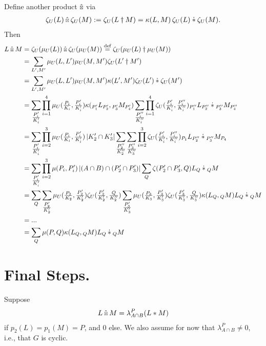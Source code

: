 \documentclass[12pt,a4paper]{amsart}
\newcommand{\Size}[1]{\left|#1\right|}
\newcommand{\kstarhat}{\mathbin{\hat{\scalebox{0.61}{$\boxtimes$}}}}
\begin{document}
Define another product $\kstarhat$ via
\begin{align*}
  \zeta_U(L) \kstarhat \zeta_U(M) := \zeta_U(L \dagger M)
  = \kappa(L, M)\, \zeta_U(L) \mathbin{\dot{*}} \zeta_U(M)\text.
\end{align*}
Then
\begin{align*}
  L \kstarhat M
  &= \zeta_U(\mu_U(L)) \kstarhat \zeta_U(\mu_U(M))
    \stackrel{\text{def}}{=} \zeta_U(\mu_U(L) \dagger \mu_U(M)) \\
  &= \sum_{L',M'} \mu_U(L, L') \mu_U(M, M') \zeta_U(L' \dagger M') \\
  &= \sum_{L',M'} \mu_U(L, L') \mu_U(M, M') \kappa(L', M') \zeta_U(L') \mathbin{\dot{*}} \zeta_U(M') \\
  &= \sum_{\tfrac{P_i'}{K_i'}}
    \prod_{i=1}^4 \mu_U(\tfrac{P_i}{K_i}, \tfrac{P_i'}{K_i'})
    \kappa({}_{P_1'}L_{P_2'}, {}_{P_3'}M_{P_4'})
    \sum_{\tfrac{P_i''}{K_i''}}
    \prod_{i=1}^4 \zeta_U(\tfrac{P_i'}{K_i'}, \tfrac{P_i''}{K_i''})
    {}_{P_1''}L_{P_2''} \mathbin{\dot{*}} {}_{P_3''}M_{P_4''}
    \\
  &= \sum_{\tfrac{P_i'}{K_i'}}
    \prod_{i=2}^3 \mu_U(\tfrac{P_i}{K_i}, \tfrac{P_i'}{K_i'})
    \Size{K_2' \cap K_3'}
    \sum_{\tfrac{P_2''}{K_2''}}
    \sum_{\tfrac{P_3''}{K_3''}}
    \prod_{i=2}^3 \zeta_U(\tfrac{P_i'}{K_i'}, \tfrac{P_i''}{K_i''})
    {}_{P_1}L_{P_2''} \mathbin{\dot{*}} {}_{P_3''}M_{P_4}
    \\
  &= \sum_{\tfrac{P_i'}{K_i'}}
    \prod_{i=2}^3 \mu(P_i, P_i')
    \Size{(A \cap B) \cap (P_2' \cap P_3')}
    \sum_{Q} \zeta(P_2' \cap P_3', Q)
    L_{Q} \mathbin{\dot{*}} {}_{Q}M
    \\
  &= \sum_{Q}
    \sum_{\tfrac{P_2'}{K_2'}}
    \mu_U(\tfrac{P_2}{K_2}, \tfrac{P_2'}{K_2'})
    \zeta_U(\tfrac{P_2'}{K_2'}, \tfrac{Q}{K_2''})
    \sum_{\tfrac{P_3'}{K_3'}}
    \mu_U(\tfrac{P_3}{K_3}, \tfrac{P_3'}{K_3'})
    \zeta_U(\tfrac{P_3'}{K_3'}, \tfrac{Q}{K_3''})
    \kappa(L_Q, {}_QM)
    L_{Q} \mathbin{\dot{*}} {}_{Q}M
    \\
  &= ... \\
  &= \sum_Q \mu(P, Q) \kappa(L_Q, {}_QM) L_Q \mathbin{\dot{*}} {}_QM
\end{align*}

\section{Final Steps.}
\label{sec:final-step}

Suppose
\begin{align*}
  L \kstarhat M = \lambda^P_{A \cap B} (L * M)
\end{align*}
if $p_2(L) = p_1(M) = P$, and $0$ else.  We also assume for now that
$\lambda^P_{A \cap B} \neq 0$, i.e., that $G$ is cyclic.
\end{document}
